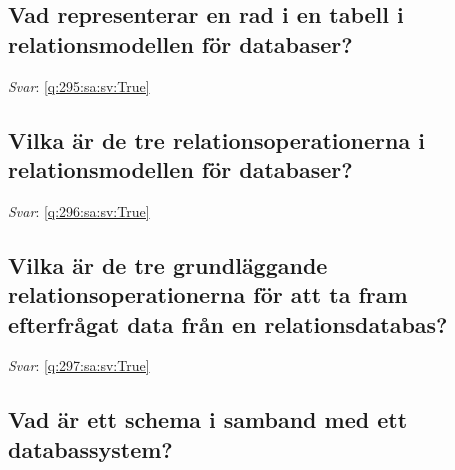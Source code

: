 \documentclass[a4paper,11pt,oneside]{article}
\begin{document}
\begin{sloppypar}
\subsection{Vad representerar en rad i en tabell i relationsmodellen f\"or databaser?}

\label{q:295:sa:sv:False}

\vspace{2cm}

\noindent\makebox[\textwidth]{\hrulefill}

\vspace{1cm}

\textit{Svar}: \autoref{q:295:sa:sv:True}



\subsection{Vilka \"ar de tre relationsoperationerna i relationsmodellen f\"or databaser?}

\label{q:296:sa:sv:False}

\vspace{2cm}

\noindent\makebox[\textwidth]{\hrulefill}

\vspace{1cm}

\textit{Svar}: \autoref{q:296:sa:sv:True}



\subsection{Vilka \"ar de tre grundl\"aggande relationsoperationerna f\"or att ta fram efterfr\r{a}gat data fr\r{a}n en relationsdatabas?}

\label{q:297:sa:sv:False}

\vspace{2cm}

\noindent\makebox[\textwidth]{\hrulefill}

\vspace{1cm}

\textit{Svar}: \autoref{q:297:sa:sv:True}



\subsection{Vad \"ar ett schema i samband med ett databassystem?}

\label{q:298:sa:sv:False}


\end{sloppypar}
\end{document}
